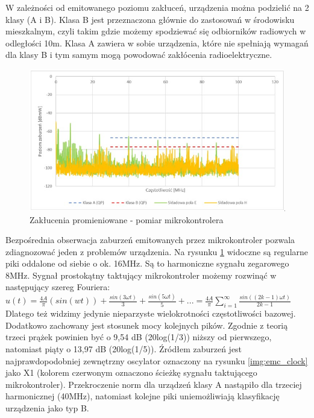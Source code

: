 W zależności od emitowanego poziomu zakłuceń, urządzenia można podzielić na 2 klasy (A i B). Klasa B jest przeznaczona głównie do zastosowań w środowisku mieszkalnym, czyli takim gdzie możemy spodziewać się odbiorników radiowych w odległości 10m. Klasa A zawiera w sobie urządzenia, które nie spełniają wymagań dla klasy B i tym samym mogą powodować zakłócenia radioelektryczne.

\begin{figure}[H]
    \centering
    \includegraphics[width=\textwidth, height=\textheight, keepaspectratio]{Graphics/emc_uc.jpg}
    \caption{Zakłucenia promieniowane - pomiar mikrokontrolera}
    \label{img:emc_uc}
\end{figure}

Bezpośrednia obserwacja zaburzeń emitowanych przez mikrokontroler pozwala zdiagnozować jeden z problemów urządzenia. Na rysunku \ref{img:emc_uc} widoczne są regularne piki oddalone od siebie o ok. 16MHz. Są to harmoniczne sygnału zegarowego 8MHz.
\newline
Sygnał prostokątny taktujący mikrokontroler możemy rozwinąć w następujący szereg Fouriera: 
\newline
$u(t) = \frac{4A}{\pi} (sin(wt)) + \frac{sin(3\omega t)}{3} + \frac{sin(5\omega t)}{5} + ... = \frac{4A}{\pi} \sum \limits_{i=1}^{\infty} \frac{sin((2k - 1)\omega t)}{2k - 1}$
\newline
Dlatego też widzimy jedynie nieparzyste wielokrotności częstotliwości bazowej. Dodatkowo zachowany jest stosunek mocy kolejnych pików. Zgodnie z teorią trzeci prążek powinien być o 9,54 dB (20log(1/3)) niższy od pierwszego, natomiast piąty o 13,97 dB (20log(1/5)).
\newline
Źródłem zaburzeń jest najprawdopodobniej zewnętrzny oscylator oznaczony na rysunku \ref{img:emc_clock} jako X1 (kolorem czerwonym oznaczono ścieżkę sygnału taktującego mikrokontroler).
\newline
Przekroczenie norm dla urządzeń klasy A nastąpiło dla trzeciej harmonicznej (40MHz), natomiast kolejne piki uniemożliwiają klasyfikację urządzenia jako typ B.

